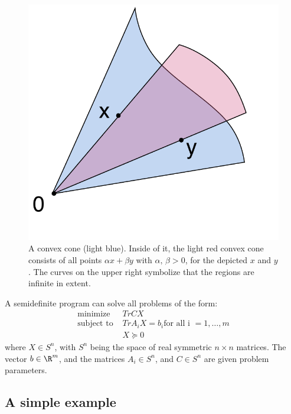 \begin{figure}
  \includegraphics[scale=.5]{figures/funnel/Convex_cone_illust}
  \caption{A convex cone (light blue). Inside of it, the light red convex cone
    consists of all points \(\alpha x + \beta y \) with \(\alpha,\, \beta > 0\),
    for the depicted \(x\) and \(y\). The curves on the upper right symbolize
    that the regions are infinite in extent.
    \cite{alexandrovConvexConeIllust2019}}
\end{figure}

A semidefinite program can solve all problems of the form:
\begin{align*}
  \text{minimize } &TrCX \\
  \text{subject to } &TrA_iX = b_i \text{for all i } = 1,\ldots,m\\
                   &X \succeq 0
\end{align*} 
where \(X \in S^n\), with \(S^n\) being the space of real symmetric \(n \times
n\) matrices. The vector \(b \in \R^m\), and the matrices \(A_i \in S^n\), and
\(C \in S^n\) are given problem
parameters\cite{wolkowiczHandbookSemidefiniteProgramming2000}.

\subsection{A simple example}
\label{subsec:A simple example}


